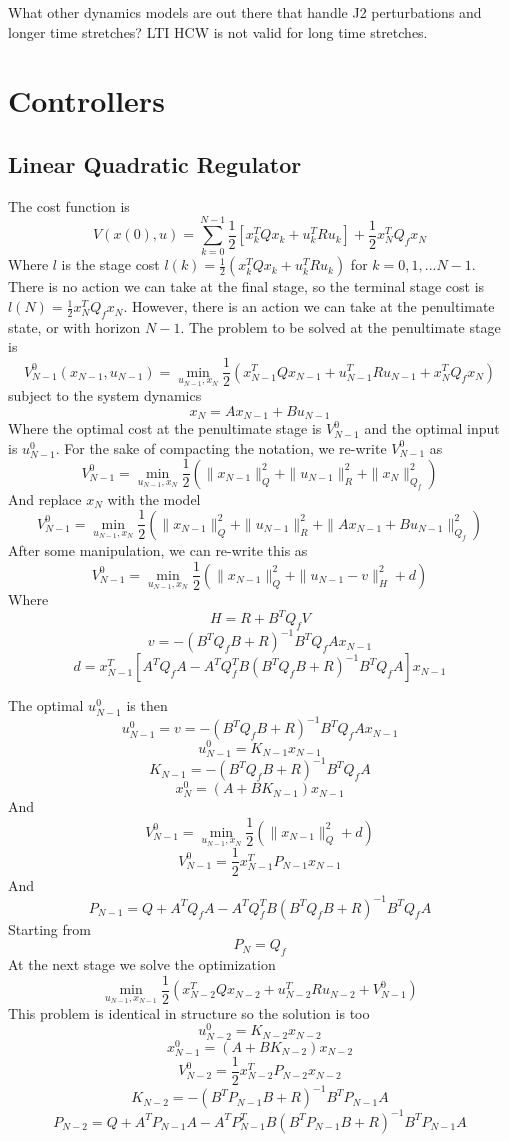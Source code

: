 \documentclass{article}
\begin{document}
What other dynamics models are out there that handle J2 perturbations and longer time stretches? LTI HCW is not valid for long time stretches.
\section{Controllers}
\subsection{Linear Quadratic Regulator}
The cost function is 
$$V(x(0), u) = \sum\limits_{k=0}^{N-1}\frac{1}{2}[x_{k}^TQx_{k} + u_{k}^TRu_{k}] + \frac{1}{2}x_N^TQ_fx_N$$
Where $l$ is the stage cost $l(k) = \frac{1}{2}(x_k^TQx_k + u_k^TRu_k)$ for $k=0,1,...N-1$.
There is no action we can take at the final stage, so the terminal stage cost is $l(N) = \frac{1}{2}x_N^TQ_fx_N$. 
However, there is an action we can take at the penultimate state, or with horizon $N-1$. 
The problem to be solved at the penultimate stage is
$$V^0_{N-1}(x_{N-1}, u_{N-1}) = \min\limits_{u_{N-1}, x_N} \frac{1}{2}(x_{N-1}^TQx_{N-1} + u_{N-1}^TRu_{N-1} + x_N^TQ_fx_N)$$
subject to the system dynamics 
$$x_N = Ax_{N-1} + Bu_{N-1}$$
Where the optimal cost at the penultimate stage is $V^0_{N-1}$ and the optimal input is $u^0_{N-1}$. 
For the sake of compacting the notation, we re-write $V_{N-1}^0$ as
$$V^0_{N-1}=\min\limits_{u_{N-1}, x_N} \frac{1}{2}(\|x_{N-1}\|_Q^2 + \|u_{N-1}\|_R^2 + \|x_{N}\|^2_{Q_f})$$
And replace $x_N$ with the model
$$V^0_{N-1}= \min\limits_{u_{N-1}, x_N}\frac{1}{2}(\|x_{N-1}\|_Q^2 + \|u_{N-1}\|_R^2 + \|Ax_{N-1} + Bu_{N-1}\|^2_{Q_f})$$
After some manipulation, we can re-write this as
$$V^0_{N-1}= \min\limits_{u_{N-1}, x_N}\frac{1}{2}(\|x_{N-1}\|_Q^2 + \|u_{N-1} - v\|_H^2 + d)$$
Where
$$H = R + B^T Q_f V$$
$$v = - (B^T Q_f B + R)^{-1} B^T Q_f A x_{N-1}$$
$$d = x^T_{N-1}[A^T Q_f A - A^T Q_f^T B(B^T Q_f B + R)^{-1} B^T Q_f A]x_{N-1}$$

The optimal $u^0_{N-1}$ is then 
$$u^0_{N-1} = v = - (B^T Q_f B + R)^{-1} B^T Q_f A x_{N-1}$$
$$u^0_{N-1} = K_{N-1} x_{N-1}$$
$$K_{N-1} = - (B^T Q_f B + R)^{-1} B^T Q_f A $$
$$x_N^0 = (A + BK_{N-1})x_{N-1}$$
And 
$$V^0_{N-1}=\min\limits_{u_{N-1}, x_N} \frac{1}{2}(\|x_{N-1}\|_Q^2  + d)$$
$$V_{N-1}^0 = \frac{1}{2}x^T_{N-1}P_{N-1} x_{N-1}$$
And 
$$P_{N-1} = Q + A^T Q_f A - A^T Q_f^T B(B^T Q_f B + R)^{-1} B^T Q_f A$$
Starting from 
$$P_N = Q_f$$
At the next stage we solve the optimization
$$\min\limits_{u_{N-1}, x_{N-1}} \frac{1}{2}(x_{N-2}^TQx_{N-2} + u_{N-2}^TRu_{N-2} + V_{N-1}^0)$$
This problem is identical in structure so the solution is too
$$u^0_{N-2} = K_{N-2} x_{N-2}$$
$$x_{N-1}^0 = (A + BK_{N-2})x_{N-2}$$
$$V_{N-2}^0 = \frac{1}{2}x^T_{N-2}P_{N-2} x_{N-2}$$
$$K_{N-2} = - (B^T P_{N-1} B + R)^{-1} B^T P_{N-1} A $$
$$P_{N-2} = Q + A^T P_{N-1} A - A^T P_{N-1}^T B(B^T P_{N-1} B + R)^{-1} B^T P_{N-1} A$$
\end{document}
